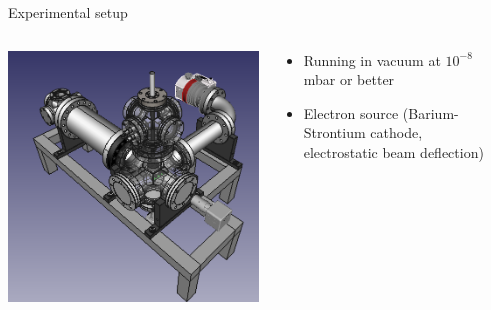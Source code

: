 \documentclass[final]{beamer}
\begin{document}
\begin{frame}[fragile]{}
\begin{columns}[T]
\begin{column}{.49\linewidth}
    \end{column}


    \begin{column}{.49\linewidth}
      \begin{block}{\large Experimental setup}
        \begin{columns}
          \begin{column}{0.4\columnwidth}
            \includegraphics[width=\columnwidth]{figures/cryoquak02.png}
          \end{column}
          \begin{column}{0.6\columnwidth}
              \begin{itemize}
                \item Running in vacuum at $10^{-8}$ mbar or better
                \item Electron source (Barium-Strontium cathode, electrostatic beam deflection)

\end{itemize}
\end{column}
\end{columns}
\end{block}
\end{column}
\end{columns}
\end{frame}
\end{document}
